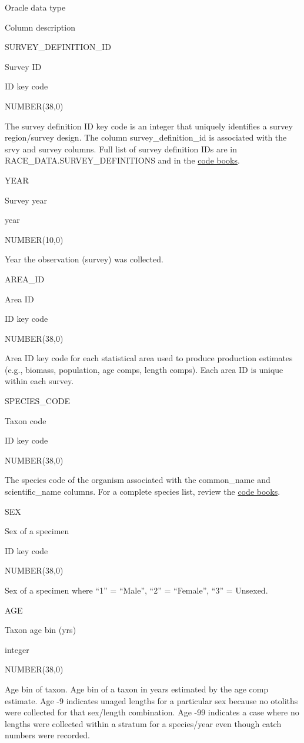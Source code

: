 \documentclass[
  letterpaper,
  oneside,
  open=any]{scrbook}
\begin{document}
Oracle data type

Column description

SURVEY\_DEFINITION\_ID

Survey ID

ID key code

NUMBER(38,0)

The survey definition ID key code is an integer that uniquely identifies
a survey region/survey design. The column survey\_definition\_id is
associated with the srvy and survey columns. Full list of survey
definition IDs are in RACE\_DATA.SURVEY\_DEFINITIONS and in the
\href{https://www.fisheries.noaa.gov/resource/document/groundfish-survey-species-code-manual-and-data-codes-manual}{code
books}.

YEAR

Survey year

year

NUMBER(10,0)

Year the observation (survey) was collected.

AREA\_ID

Area ID

ID key code

NUMBER(38,0)

Area ID key code for each statistical area used to produce production
estimates (e.g., biomass, population, age comps, length comps). Each
area ID is unique within each survey.

SPECIES\_CODE

Taxon code

ID key code

NUMBER(38,0)

The species code of the organism associated with the common\_name and
scientific\_name columns. For a complete species list, review the
\href{https://www.fisheries.noaa.gov/resource/document/groundfish-survey-species-code-manual-and-data-codes-manual}{code
books}.

SEX

Sex of a specimen

ID key code

NUMBER(38,0)

Sex of a specimen where ``1'' = ``Male'', ``2'' = ``Female'', ``3'' =
Unsexed.

AGE

Taxon age bin (yrs)

integer

NUMBER(38,0)

Age bin of taxon. Age bin of a taxon in years estimated by the age comp
estimate. Age -9 indicates unaged lengths for a particular sex because
no otoliths were collected for that sex/length combination. Age -99
indicates a case where no lengths were collected within a stratum for a
species/year even though catch numbers were recorded.
\end{document}

